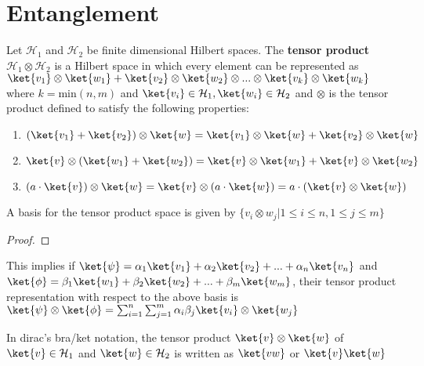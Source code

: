 \section{Entanglement}

\begin{defn}
    Let $\mathcal{H}_1$ and $\mathcal{H}_2$ be finite dimensional Hilbert spaces.
    The \textbf{tensor product} $\mathcal{H}_1 \otimes \mathcal{H}_2$ is a Hilbert space in which every element can be represented as $\ket{v_1} \otimes \ket{w_1} + \ket{v_2} \otimes \ket{w_2} \otimes ... \otimes \ket{v_k} \otimes \ket{w_k}$ where $k = \text{min}(n,m)$ and $\ket{v_i} \in \mathcal{H}_1, \ket{w_i} \in \mathcal{H}_2$ and $\otimes$ is the tensor product defined to satisfy the following properties:
    \begin{enumerate}
        \item $(\ket{v_1} + \ket{v_2}) \otimes \ket{w} = \ket{v_1} \otimes \ket{w} + \ket{v_2} \otimes \ket{w}$
        \item $\ket{v} \otimes (\ket{w_1} + \ket{w_2}) = \ket{v} \otimes \ket{w_1} + \ket{v} \otimes \ket{w_2}$
        \item $(a \cdot \ket{v}) \otimes \ket{w} = \ket{v} \otimes (a \cdot \ket{w}) = a \cdot (\ket{v} \otimes \ket{w})$
    \end{enumerate}
\end{defn}

\begin{result}
    A basis for the tensor product space is given by $\{ v_i \otimes w_j | 1 \leq i \leq n, 1 \leq j \leq m \}$
\end{result}
\begin{proof}

\end{proof}

This implies if $\ket{\psi} = \alpha_1 \ket{v_1} + \alpha_2 \ket{v_2} + ... + \alpha_n \ket{v_n}$ and $\ket{\phi} = \beta_1 \ket{w_1} + \beta_2 \ket{w_2} + ... + \beta_m \ket{w_m}$, their tensor product representation with respect to the above basis is $\ket{\psi} \otimes \ket{\phi} = \sum_{i=1}^n \sum_{j=1}^m \alpha_i \beta_j \ket{v_i} \otimes \ket{w_j}$


\begin{notation}
    In dirac's bra/ket notation, the tensor product $\ket{v} \otimes \ket{w}$ of $\ket{v} \in \mathcal{H}_1$ and $\ket{w} \in \mathcal{H}_2$ is written as $\ket{vw}$ or $\ket{v}\ket{w}$
\end{notation}

